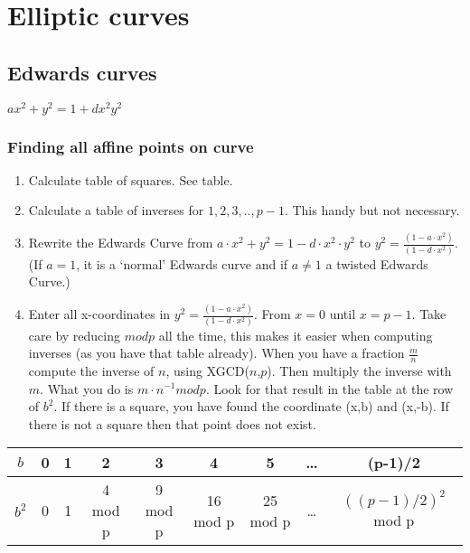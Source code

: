 \documentclass{article}
\begin{document}
\section{Elliptic curves}
\subsection{Edwards curves}
$ax^2+y^2 = 1 + dx^2y^2$

\subsubsection{Finding all affine points on curve}
\begin{enumerate}
\item Calculate table of squares. See table.
\item Calculate a table of inverses for $1,2,3,.., p-1$. This handy but not necessary.
\item Rewrite the Edwards Curve from $a \cdot x^2 + y^2 = 1 - d \cdot x^2 \cdot y^2$ to $y^2 = \frac{(1 - a \cdot x^2)}{(1-d \cdot x^2)}$. (If $a=1$, it is a `normal' Edwards curve and if $a\not= 1$ a twisted Edwards Curve.)
\item Enter all x-coordinates in $y^2 = \frac{(1 - a \cdot x^2)}{(1-d \cdot x^2)}$. From $x = 0$ until $x = p-1$. Take care by reducing $mod p$ all the time, this makes it easier when computing inverses (as you have that table already). When you have a fraction $\frac{m}{n}$ compute the inverse of $n$, using XGCD($n$,$p$). Then multiply the inverse with $m$. What you do is $m \cdot n^{-1} mod p$. Look for that result in the table at the row of $b^2$. If there is a square, you have found the coordinate (x,b) and (x,-b). If there is not a square then that point does not exist.

\end{enumerate}



\begin{tabular}{|c|c|c|c|c|c|c|c|c|}
\hline
$b $ & 0 & 1 & 2 & 3 & 4 & 5 & \ldots & (p-1)/2 \\
\hline
$b^2 $ & 0 & 1 & 4 mod p & 9 mod p & 16 mod p & 25 mod p & \ldots & $((p-1)/2)^2$ mod p \\
\hline
\end{tabular}
\end{document}
